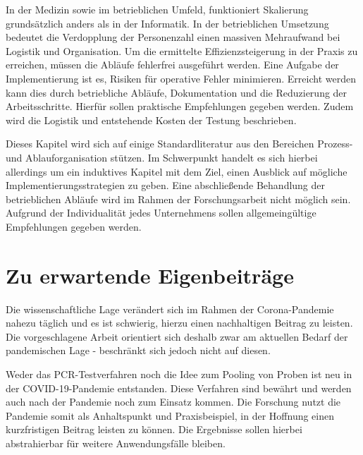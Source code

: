 In der Medizin sowie im betrieblichen Umfeld, funktioniert Skalierung grundsätzlich anders als in der Informatik.
In der betrieblichen Umsetzung bedeutet die Verdopplung der Personenzahl einen massiven Mehraufwand bei Logistik und Organisation.
Um die ermittelte Effizienzsteigerung in der Praxis zu erreichen, müssen die Abläufe fehlerfrei ausgeführt werden.
Eine Aufgabe der Implementierung ist es, Risiken für operative Fehler minimieren.
Erreicht werden kann dies durch betriebliche Abläufe, Dokumentation und die Reduzierung der Arbeitsschritte.
Hierfür sollen praktische Empfehlungen gegeben werden.
Zudem wird die Logistik und entstehende Kosten der Testung beschrieben.

Dieses Kapitel wird sich auf einige Standardliteratur aus den Bereichen Prozess- und Ablauforganisation stützen.
Im Schwerpunkt handelt es sich hierbei allerdings um ein induktives Kapitel mit dem Ziel, einen Ausblick auf mögliche Implementierungsstrategien zu geben.
Eine abschließende Behandlung der betrieblichen Abläufe wird im Rahmen der Forschungsarbeit nicht möglich sein.
Aufgrund der Individualität jedes Unternehmens sollen allgemeingültige Empfehlungen gegeben werden.

\section{Zu erwartende Eigenbeiträge}
Die wissenschaftliche Lage verändert sich im Rahmen der Corona-Pandemie nahezu täglich und es ist schwierig, hierzu einen nachhaltigen Beitrag zu leisten.
Die vorgeschlagene Arbeit orientiert sich deshalb zwar am aktuellen Bedarf der pandemischen Lage - beschränkt sich jedoch nicht auf diesen.

Weder das PCR-Testverfahren noch die Idee zum Pooling von Proben ist neu in der COVID-19-Pandemie entstanden.
Diese Verfahren sind bewährt und werden auch nach der Pandemie noch zum Einsatz kommen.
Die Forschung nutzt die Pandemie somit als Anhaltspunkt und Praxisbeispiel, in der Hoffnung einen kurzfristigen Beitrag leisten zu können.
Die Ergebnisse sollen hierbei abstrahierbar für weitere Anwendungsfälle bleiben.